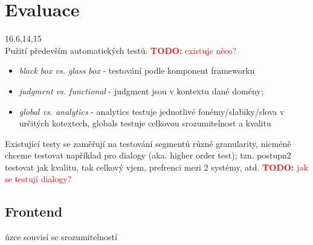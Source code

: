 \documentclass{article}
\newcommand{\td}[1]{\textcolor{red}{\textbf{TODO:} #1}}
\begin{document}
\section*{Evaluace}\cite{huang2001spoken}16.6,14,15 \\
Pužití především automatických testů. \td{existuje něco?}
\begin{itemize}
\item\textit{black box vs. glass box} - testování podle komponent frameworku
\item \textit{judgment vs. functional} - judgment jsou v kontextu dané domény;
\item\textit{global vs. analytics} - analytics testuje jednotlivé fonémy/slabiky/slova v určitých kotextech, globals testuje celkovou srozumitelnost a kvalitu
\end{itemize}
Existující testy se zaměřují na testování segmentů různé granularity, nicméně chceme testovat například pro dialogy (aka. higher order test); tzn. postupn2 testovat jak kvalitu, tak celkový vjem, prefrenci mezi 2 systémy, atd. \td{jak se testují dialogy?}
\subsection*{Frontend} úzce souvisí se srozumitelností
\end{document}
